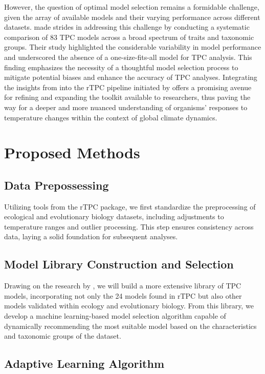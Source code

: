 \documentclass{article}
\begin{document}
\hfill\break
However, the question of optimal model selection remains a formidable challenge, given the array of available models and their varying performance across different datasets. \cite{Kontopoulos2021} made strides in addressing this challenge by conducting a systematic comparison of 83 TPC models across a broad spectrum of traits and taxonomic groups. Their study highlighted the considerable variability in model performance and underscored the absence of a one-size-fits-all model for TPC analysis. This finding emphasizes the necessity of a thoughtful model selection process to mitigate potential biases and enhance the accuracy of TPC analyses. Integrating the insights from \cite{Kontopoulos2021} into the rTPC pipeline initiated by \cite{Padfield2021} offers a promising avenue for refining and expanding the toolkit available to researchers, thus paving the way for a deeper and more nuanced understanding of organisms' responses to temperature changes within the context of global climate dynamics.

\section{Proposed Methods}
\subsection{Data Prepossessing}

Utilizing tools from the rTPC package, we first standardize the preprocessing of ecological and evolutionary biology datasets, including adjustments to temperature ranges and outlier processing. This step ensures consistency across data, laying a solid foundation for subsequent analyses.

\subsection{Model Library Construction and Selection}

Drawing on the research by \cite{Kontopoulos2021}, we will build a more extensive library of TPC models, incorporating not only the 24 models found in rTPC but also other models validated within ecology and evolutionary biology. From this library, we develop a machine learning-based model selection algorithm capable of dynamically recommending the most suitable model based on the characteristics and taxonomic groups of the dataset.

\subsection{Adaptive Learning Algorithm}
\end{document}
